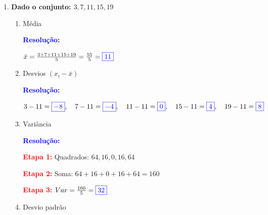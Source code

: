 \documentclass[11pt]{article}
\newcommand{\respostaNum}[1]{\textcolor{blue}{\boxed{#1}}}
\newcommand{\respostaTxt}[1]{\textcolor{blue}{#1}}
\newcommand{\resolucao}{\textbf{\textcolor{blue}{Resolução:}}}
\begin{document}
\begin{multicols}{2}
\begin{enumerate}[leftmargin=*]
\begin{enumerate}[label=\alph*)]
\textbf{\textcolor{red}{Etapa 2:}} Desvios: $-25, -15, -5, 5, 15, 25$

\textbf{\textcolor{red}{Etapa 3:}} Quadrados: $625, 225, 25, 25, 225, 625$

\textbf{\textcolor{red}{Etapa 4:}} Soma: $625+225+25+25+225+625 = 1750$

\textbf{\textcolor{red}{Etapa 5:}} Variância: $Var_Y = \frac{1750}{6} \approx 291,67$

\textbf{\textcolor{red}{Etapa 6:}} $DP_Y = \sqrt{291,67} \approx \respostaNum{17,08}$

\item Coeficiente de variação

\resolucao

$CV_X = \frac{3,42}{105} \times 100\% \approx \respostaNum{3,26\%}$

$CV_Y = \frac{17,08}{25} \times 100\% \approx \respostaNum{68,32\%}$

\item Compare a variabilidade relativa

\respostaTxt{Conjunto X é muito mais homogêneo (3,26\% < 68,32\%)}
\end{enumerate}

\item \textbf{Dado o conjunto: $3, 7, 11, 15, 19$}

\begin{enumerate}[label=\alph*)]
\item Média

\resolucao

$\bar{x} = \frac{3+7+11+15+19}{5} = \frac{55}{5} = \respostaNum{11}$

\item Desvios $(x_i - \bar{x})$

\resolucao

$3-11 = \respostaNum{-8},\quad 7-11 = \respostaNum{-4},\quad 11-11 = \respostaNum{0},\quad 15-11 = \respostaNum{4},\quad 19-11 = \respostaNum{8}$

\item Variância

\resolucao

\textbf{\textcolor{red}{Etapa 1:}} Quadrados: $64, 16, 0, 16, 64$

\textbf{\textcolor{red}{Etapa 2:}} Soma: $64+16+0+16+64 = 160$

\textbf{\textcolor{red}{Etapa 3:}} $Var = \frac{160}{5} = \respostaNum{32}$

\item Desvio padrão


\end{enumerate}
\end{enumerate}
\end{multicols}
\end{document}
